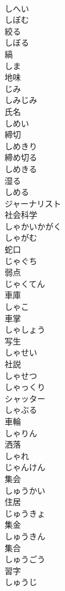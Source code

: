 \documentclass[8pt]{extreport}
\begin{document}
\begin{CJK}{UTF8}{min}
\\	しへい	
\\	しぼむ	
\\	絞る 
\\	しぼる	
\\	縞 
\\	しま	
\\	地味 
\\	じみ	
\\	しみじみ	
\\	氏名 
\\	しめい	
\\	締切 
\\	しめきり	
\\	締め切る 
\\	しめきる	
\\	湿る 
\\	しめる	
\\	ジャーナリスト	
\\	社会科学 
\\	しゃかいかがく	
\\	しゃがむ	
\\	蛇口 
\\	じゃぐち	
\\	弱点 
\\	じゃくてん	
\\	車庫 
\\	しゃこ	
\\	車掌 
\\	しゃしょう	
\\	写生 
\\	しゃせい	
\\	社説 
\\	しゃせつ	
\\	しゃっくり	
\\	シャッター	
\\	しゃぶる	
\\	車輪 
\\	しゃりん	
\\	洒落 
\\	しゃれ	
\\	じゃんけん	
\\	集会 
\\	しゅうかい	
\\	住居 
\\	じゅうきょ	
\\	集金 
\\	しゅうきん	
\\	集合 
\\	しゅうごう	
\\	習字 
\\	しゅうじ	

\end{CJK}
\end{document}
